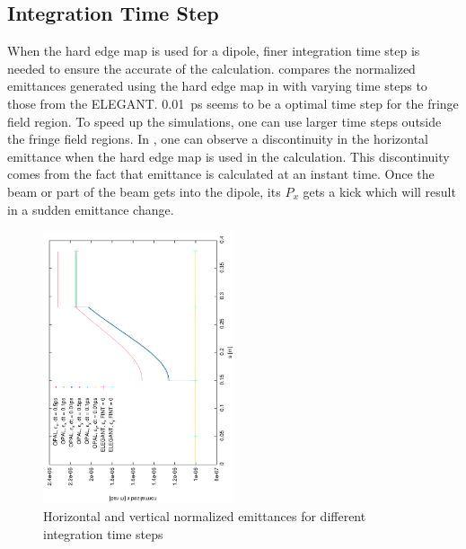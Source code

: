 \subsection{Integration Time Step}
When the hard edge map is used for a dipole, finer integration time step is needed to ensure the accurate of the calculation.  compares the normalized emittances generated using the hard edge map in \opal with varying time steps to those from the ELEGANT. \SI{0.01}{\pico\second} seems to be a optimal time step for the fringe field region. To speed up the simulations, one can use larger time steps outside the fringe field regions. In , one can observe a discontinuity in the horizontal emittance when the hard edge map is used in the calculation. This discontinuity comes from the fact that \opal emittance is calculated at an instant time. Once the beam or part of the beam gets into the dipole, its $P_x$ gets a kick which will result in a sudden emittance change.
\begin{figure}[!htbp]
\centering
\includegraphics[width=0.5\textwidth,
angle = -90,
trim = 0mm 20mm 0mm 8mm, clip]{figures/Benchmarks/report-emit-dt}
\caption{Horizontal and vertical normalized emittances for different integration time steps}
\label{fig:plot-emit-dt}
\end{figure}

